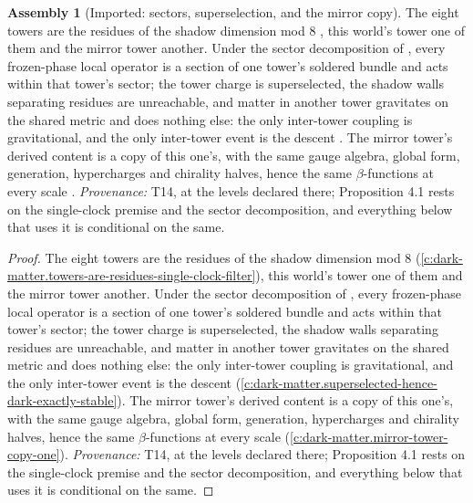 \documentclass[11pt]{article}
\theoremstyle{definition}
\newtheorem{assembled}[theorem]{Assembly}
\theoremstyle{plain}
\begin{document}
\begin{assembled}[Imported: sectors, superselection, and the mirror copy]\label{c:standard-model.imported-sectors-superselection-mirror-copy}
The eight towers are the residues of the shadow dimension mod $8$ \cite[Prop.~3.1]{ButlerT14}, this world's tower one of them and the mirror tower another. Under the sector decomposition of \cite[Def.~3.6]{ButlerT14}, every frozen-phase local operator is a section of one tower's soldered bundle and acts within that tower's sector; the tower charge is superselected, the shadow walls separating residues are unreachable, and matter in another tower gravitates on the shared metric and does nothing else: the only inter-tower coupling is gravitational, and the only inter-tower event is the descent \cite[Prop.~4.1]{ButlerT14}. The mirror tower's derived content is a copy of this one's, with the same gauge algebra, global form, generation, hypercharges and chirality halves, hence the same $\beta$-functions at every scale \cite[Thm.~4.3(i),(iii)]{ButlerT14}. \emph{Provenance:} T14, at the levels declared there; Proposition 4.1 rests on the single-clock premise and the sector decomposition, and everything below that uses it is conditional on the same.
\end{assembled}
\begin{proof}
The eight towers are the residues of the shadow dimension mod $8$ \cite[Prop.~3.1]{ButlerT14} (\ref{c:dark-matter.towers-are-residues-single-clock-filter}), this world's tower one of them and the mirror tower another. Under the sector decomposition of \cite[Def.~3.6]{ButlerT14}, every frozen-phase local operator is a section of one tower's soldered bundle and acts within that tower's sector; the tower charge is superselected, the shadow walls separating residues are unreachable, and matter in another tower gravitates on the shared metric and does nothing else: the only inter-tower coupling is gravitational, and the only inter-tower event is the descent \cite[Prop.~4.1]{ButlerT14} (\ref{c:dark-matter.superselected-hence-dark-exactly-stable}). The mirror tower's derived content is a copy of this one's, with the same gauge algebra, global form, generation, hypercharges and chirality halves, hence the same $\beta$-functions at every scale \cite[Thm.~4.3(i),(iii)]{ButlerT14} (\ref{c:dark-matter.mirror-tower-copy-one}). \emph{Provenance:} T14, at the levels declared there; Proposition 4.1 rests on the single-clock premise and the sector decomposition, and everything below that uses it is conditional on the same.

\end{proof}
\end{document}
